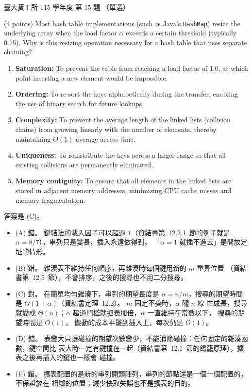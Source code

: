 \begin{pastexam}[label={px:ntu-115-dsa-15}]{臺大資工所 115 學年度 第 15 題}
（單選）

(4 points) Most hash table implementations (such as Java's \texttt{HashMap}) resize the underlying array when the load factor $\alpha$ exceeds a certain threshold (typically 0.75). Why is this resizing operation necessary for a hash table that uses separate chaining?
\begin{enumerate}[label=(\Alph*)]
\item \textbf{Saturation:} To prevent the table from reaching a load factor of 1.0, at which point inserting a new element would be impossible.
\item \textbf{Ordering:} To re-sort the keys alphabetically during the transfer, enabling the use of binary search for future lookups.
\item \textbf{Complexity:} To prevent the average length of the linked lists (collision chains) from growing linearly with the number of elements, thereby maintaining $O(1)$ average access time.
\item \textbf{Uniqueness:} To redistribute the keys across a larger range so that all existing collisions are permanently eliminated.
\item \textbf{Memory contiguity:} To ensure that all elements in the linked lists are stored in adjacent memory addresses, minimizing CPU cache misses and memory fragmentation.
\end{enumerate}
\end{pastexam}

\begin{pastsoln}
答案是 (C)。
\begin{itemize}
\item (A) 錯。 鏈結法的載入因子可以超過 $1$（資結書第~12.2.1~節的例子就是
$\alpha = 8/7$），串列只是變長，插入永遠做得到。 「$\alpha = 1$ 就插不進去」是開放定址的情形。
\item (B) 錯。 雜湊表不維持任何順序，再雜湊時每個鍵用新的 $m$ 重算位置
（資結書第~12.5~節），不會排序，之後的搜尋也不用二分搜尋。
\item (C) 對。 在簡單均勻雜湊下，串列的期望長度是 $\alpha = n/m$，搜尋的期望時間是
$\Theta(1 + \alpha)$（資結書定理~12.2）。 $m$ 固定不變時，$\alpha$ 隨 $n$ 線
性成長，搜尋就變成 $\Theta(n)$；$\alpha$ 超過門檻就把表加倍，$\alpha$ 一直維持在常數以下，
搜尋的期望時間是 $O(1)$。 搬動的成本平攤到插入上，每次仍是 $O(1)$。
\item (D) 錯。 表變大只讓碰撞的期望次數變少，不能消除碰撞：任何固定的雜湊函數，鍵空間比
表大時一定有鍵撞在一起（資結書第~12.1~節的鴿籠原理），擴表之後再插入的鍵也一樣會
碰撞。
\item (E) 錯。 擴表配置的是新的串列開頭陣列，串列的節點還是一個一個配置的，不保證放在
相鄰的位置；減少快取失誤也不是擴表的目的。
\end{itemize}
\end{pastsoln}
